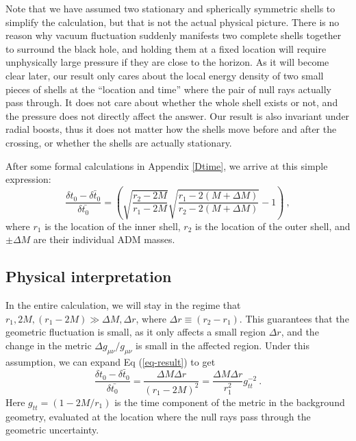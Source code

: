 \documentclass[aps,showpacs,onecolumn,floats,prd,superscriptaddress,nofootinbib]{revtex4-1}
\begin{document}
Note that we have assumed two stationary and spherically symmetric shells to simplify the calculation, but that is not the actual physical picture.
There is no reason why vacuum fluctuation suddenly manifests two complete shells together to surround the black hole, and holding them at a fixed location will require unphysically large pressure if they are close to the horizon.
As it will become clear later, our result only cares about the local energy density of two small pieces of shells at the ``location and time'' where the pair of null rays actually pass through.
It does not care about whether the whole shell exists or not, and the pressure does not directly affect the answer.
Our result is also invariant under radial boosts, thus it does not matter how the shells move before and after the crossing, or whether the shells are actually stationary.

After some formal calculations in Appendix \ref{Dtime}, we arrive at this simple expression:
\begin{equation}
\frac{\delta t_0 - \bar{\delta t_0}}{\delta \bar{t_0}} = 
\left(\sqrt{\frac{r_2-2M}{r_1-2M}}\sqrt{\frac{r_1-2(M+\Delta M)}{r_2-2(M+\Delta M)}}-1\right)~,
\label{eq-result}
\end{equation}
where $r_1$ is the location of the inner shell, $r_2$ is the location of the outer shell, and $\pm\Delta M$ are their individual ADM masses. 

\subsection{Physical interpretation}

In the entire calculation, we will stay in the regime that $r_1, 2M, (r_1-2M) \gg \Delta M, \Delta r$, where $\Delta r \equiv(r_2-r_1)$. 
This guarantees that the geometric fluctuation is small, as it only affects a small region $\Delta r$, and the change in the metric $\Delta g_{\mu\nu}/g_{\mu\nu}$ is small in the affected region.
Under this assumption, we can expand Eq (\ref{eq-result}) to get 
\begin{equation}
	\frac{\delta t_0 - \bar{ \delta t_0}}{\delta \bar{t_0}} = \frac{\Delta M \Delta r}{(r_1-2M)^2} = \frac{\Delta M \Delta r}{r_1^2} g_{tt}^{-2}~.
		\label{lim-result}
\end{equation}
Here $g_{tt}=(1-2M/r_1)$ is the time component of the metric in the background geometry, evaluated at the location where the null rays pass through the geometric uncertainty. 
\end{document}

